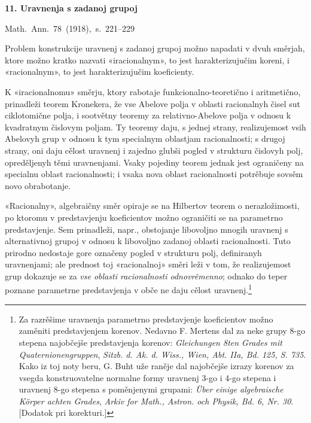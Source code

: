 \documentclass[11pt]{article}
\begin{document}

\begin{center}
{\Large\bfseries 11. Uravnenja s zadanoj grupoj}\par
\vspace{1.5em}
\mbox{Math. Ann. 78 (1918), s. 221--229}
\end{center}

\vspace{4em}

Problem konstrukcije uravnenj s zadanoj grupoj možno napadati v dvuh směrjah, ktore možno kratko nazvati «iracionalnym», to jest harakterizujučim koreni, i «racionalnym», to jest harakterizujučim koeficienty.

K «iracionalnomu» směrju, ktory rabotaje funkcionalno-teoretično i aritmetično, prinadleži teorem Kronekera, že vse Abelove polja v oblasti racionalnyh čisel sut ciklotomične polja, i sootvětny teoremy za relativno-Abelove polja v odnosu k kvadratnym čislovym poljam. Ty teoremy daju, s jednej strany, realizujemost vsih Abelovyh grup v odnosu k tym specialnym oblastjam racionalnosti; s drugoj strany, oni daju cělost uravnenj i zajedno glubši pogled v strukturu čislovyh polj, opreděljenyh těmi uravnenjami. Vsaky pojediny teorem jednak jest ograničeny na specialnu oblast racionalnosti; i vsaka nova oblast racionalnosti potrěbuje sovsěm novo obrabotanje.

«Racionalny», algebraičny směr opiraje se na Hilbertov teorem o nerazložimosti, po ktoromu v predstavjenju koeficientov možno ograničiti se na parametrno predstavjenje. Sem prinadleži, napr., obstojanje libovoljno mnogih uravnenj s alternativnoj grupoj v odnosu k libovoljno zadanoj oblasti racionalnosti. Tuto prirodno nedostaje gore označeny pogled v strukturu polj, definiranyh uravnenjami; ale prednost toj «racionalnoj» směri leži v tom, že realizujemost grup dokazuje se za {\itshape vse oblasti racionalnosti odnovrěmenno}; odnako do teper poznane parametrne predstavjenja v obče ne daju cělost uravnenj.\footnote{Za razrěšime uravnenja parametrno predstavjenje koeficientov možno zaměniti predstavjenjem korenov. Nedavno F. Mertens dal za neke grupy 8-go stepena najobčejše predstavjenja korenov: \emph{Gleichungen 8ten Grades mit Quaternionengruppen}, \emph{Sitzb. d. Ak. d. Wiss., Wien, Abt. IIa, Bd. 125, S. 735}. Kako iz toj noty beru, G. Buht uže raněje dal najobčejše izrazy korenov za vsegda konstruovatelne normalne formy uravnenj 3-go i 4-go stepena i uravnenj 8-go stepena s poměnjenymi grupami: \emph{Über einige algebraische Körper achten Grades}, \emph{Arkiv for Math., Astron. och Physik, Bd. 6, Nr. 30}. [Dodatok pri korekturi.]} 
\end{document}
